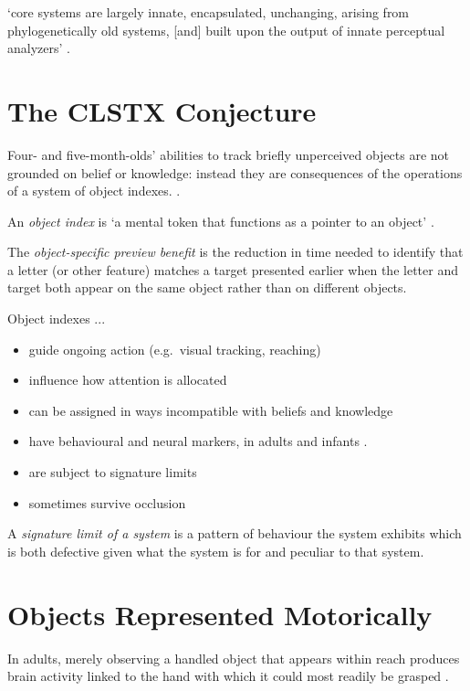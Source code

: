 \documentclass[12pt]{extarticle}
\begin{document}
\begin{multicols*}{3}
‘core systems are
largely innate,
encapsulated,
unchanging,
arising from phylogenetically old systems, [and]
built upon the output of innate perceptual analyzers’
\citep[p.~520]{Carey:1996hl}.



\section{The CLSTX Conjecture}

Four- and five-month-olds' abilities to track briefly unperceived objects
are not grounded on belief or knowledge:
instead
they are consequences of the operations of
a system of object indexes.
\citep{Leslie:1998zk,Scholl:1999mi,Carey:2001ue,scholl:2007_objecta,carey:2009_origin}.

An \emph{object index} is ‘a mental token that functions as a
pointer to an object’ \citep[p.\ 11]{Leslie:1998zk}.

The \emph{object-specific preview benefit} is the reduction in time needed to identify that a letter (or other feature) matches a target presented earlier when the letter and target both appear on the same object rather than on different objects.

Object indexes ...
\begin{itemize}
\item guide ongoing action (e.g.~visual tracking, reaching)
\item influence how attention is allocated
\citep{flombaum:2008_attentional}
\item can be assigned in ways incompatible with beliefs and knowledge \citep[e.g.][]{Mitroff:2004pc, mitroff:2007_space}
\item have behavioural  and neural markers, in adults and infants   \citep{richardson:2004_multimodal,kaufman:2005_oscillatory}.
\item are subject to signature limits \citep[pp.~83--87]{carey:2009_origin}
\item sometimes survive occlusion \citep{flombaum:2006_temporal}
\end{itemize}

A \emph{signature limit of a system} is a pattern of behaviour the system exhibits which is both defective given what the system is for and peculiar to that system.


\section{Objects Represented Motorically}
In adults, merely observing a handled object that appears within reach produces brain activity linked to the hand with which it could most readily be grasped \citep{cardellicchio:2011_space}.


\end{multicols*}
\end{document}
